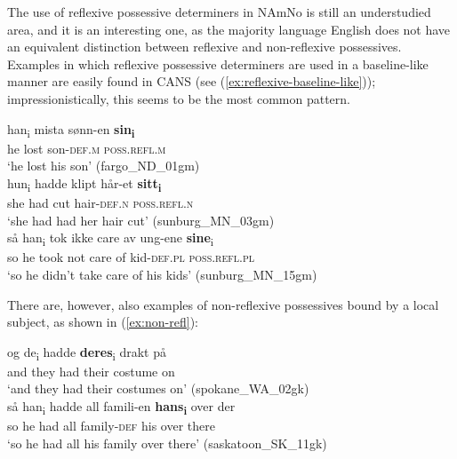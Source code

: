 \documentclass[output=paper,colorlinks,citecolor=brown]{langscibook}
\begin{document}
\noindent The use of reflexive possessive determiners in NAmNo is still an understudied area, and it is an interesting one, as the majority language English does not have an equivalent distinction between reflexive and non-reflexive possessives. Examples in which reflexive possessive determiners are used in a baseline-like manner are easily found in CANS (see (\ref{ex:reflexive-baseline-like})); impressionistically, this seems to be the most common pattern. 

\ea \label{ex:reflexive-baseline-like}
\ea \gll  han\textsubscript{i} mista sønn-en \textbf{sin\textsubscript{i}} \\
he lost son-\textsc{def.m} \textsc{poss.refl.m}\\
\glt `he lost his son' (fargo\_ND\_01gm) \\
\ex \gll hun\textsubscript{i} hadde klipt hår-et \textbf{sitt\textsubscript{i}} \\
she had cut hair-\textsc{def.n} \textsc{poss.refl.\textsc{n}}\\
\glt `she had had her hair cut'  (sunburg\_MN\_03gm)\\
\ex \gll så han\textsubscript{i} tok ikke care av ung-ene \textbf{sine}\textsubscript{i} \\
so he took not care of kid-\textsc{def.pl} \textsc{poss.refl.pl}\\
\glt `so he didn't take care of his kids' (sunburg\_MN\_15gm)\\
\z 
\z 



\noindent There are, however, also examples of non-reflexive possessives bound by a local subject, as shown in (\ref{ex:non-refl}):

\ea \label{ex:non-refl}
\ea \label{ex:deresdrakt} \gll og de\textsubscript{i} hadde \textbf{deres}\textsubscript{i} drakt på \\
 and they had their costume on \\
\glt `and they had their costumes on' (spokane\_WA\_02gk) \\
\ex \gll så han\textsubscript{i} hadde all famili-en \textbf{hans\textsubscript{i}} over der \\
so he had all family-\textsc{def} his over there \\
\glt `so he had all his family over there' (saskatoon\_SK\_11gk)\\
\z 
\z 
\end{document}

